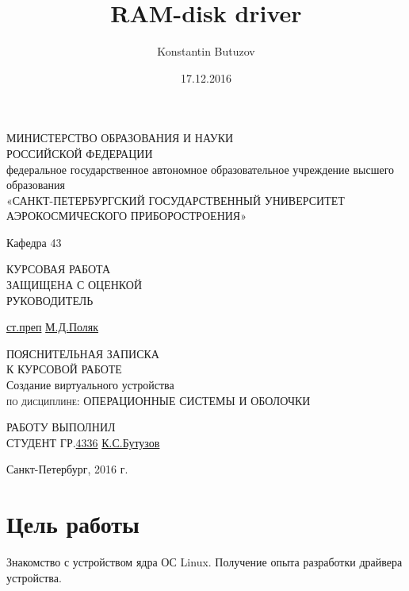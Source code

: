 \documentclass[11pt]{article}
\title{RAM-disk driver}
\date{17.12.2016}
\author{Konstantin Butuzov}
\begin{document}
\begin{titlepage}
  \begin{center}
    \large
    МИНИСТЕРСТВО ОБРАЗОВАНИЯ И НАУКИ \\РОССИЙСКОЙ ФЕДЕРАЦИИ\\
    федеральное государственное автономное образовательное учреждение высшего образования\\
    «САНКТ-ПЕТЕРБУРГСКИЙ ГОСУДАРСТВЕННЫЙ УНИВЕРСИТЕТ 
    АЭРОКОСМИЧЕСКОГО ПРИБОРОСТРОЕНИЯ»

    Кафедра 43   
    \end{center}
	\vfill
	\noindent КУРСОВАЯ РАБОТА
    \normalsize{}\\
    \normalsize{ЗАЩИЩЕНА С ОЦЕНКОЙ}\\
    \normalsize{РУКОВОДИТЕЛЬ}
    
    \underline{ст.преп}
    \hspace{5cm}
    \underline{\hspace{3cm}}
    \hspace{3cm}
    \underline{М.Д.Поляк}
    \vfill
    
	\begin{center}
	\normalsize{ПОЯСНИТЕЛЬНАЯ ЗАПИСКА}\\
	\normalsize{К КУРСОВОЙ РАБОТЕ}\\
	\vfill
	\normalsize{Создание виртуального устройства}\\
	\vfill
    \textsc{по дисциплине: ОПЕРАЦИОННЫЕ СИСТЕМЫ И ОБОЛОЧКИ}\\
	\end{center}

	\vfill
	\noindent РАБОТУ ВЫПОЛНИЛ
	\normalsize{}\\  
	\normalsize{СТУДЕНТ ГР.}\hspace{1cm}\underline{4336}
	\hspace{2cm}
	\underline{\hspace{3cm}}
	\hspace{3cm}
	\underline{К.С.Бутузов}
\vfill

\begin{center}
  Санкт-Петербург, 2016 г.
\end{center}
\end{titlepage}
\newpage
\section{Цель работы}

Знакомство с устройством ядра ОС Linux. Получение опыта разработки драйвера устройства.
\end{document}
